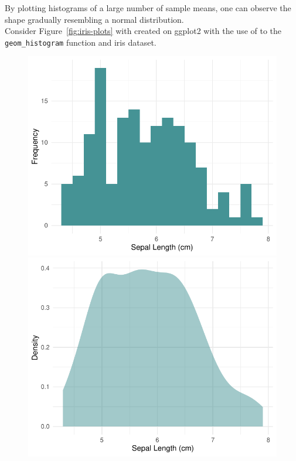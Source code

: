 \documentclass{article}\usepackage[]{graphicx}\usepackage[]{xcolor}
\newenvironment{knitrout}{}{} %
\numberwithin{equation}{section}
\begin{document}
\noindent By plotting histograms of a large number of sample means, one can observe the shape gradually resembling a normal distribution.\\

\noindent
Consider Figure~\ref{fig:iris-plots} with created on ggplot2 with the use of to the \texttt{geom\_histogram} function and iris dataset.

\begin{figure}[htbp]
  \centering
  \begin{minipage}[b]{0.48\linewidth}
\begin{knitrout}\scriptsize
{}\color{fgcolor}

{\centering \includegraphics[width=\linewidth]{figure/beamer-hist2-1} 

}


\end{knitrout}
  \end{minipage}
  \hfill
  \begin{minipage}[b]{0.48\linewidth}
\begin{knitrout}\scriptsize
{}\color{fgcolor}

{\centering \includegraphics[width=\linewidth]{figure/beamer-kde3-1} 

}
\end{knitrout}
\end{minipage}
\end{figure}
\end{document}
